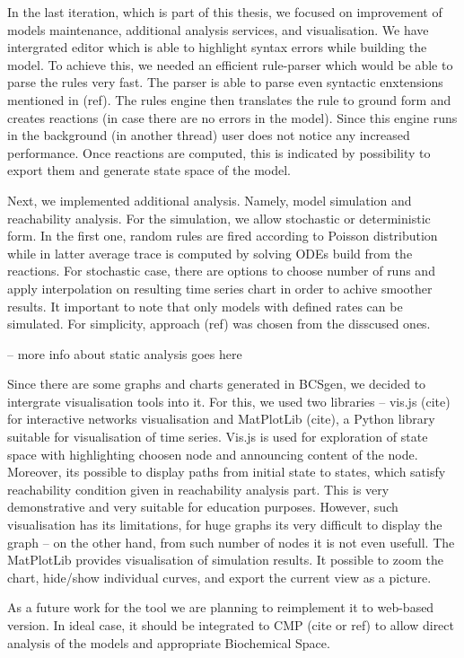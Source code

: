 \documentclass[12pt]{fithesis2}
\begin{document}
In the last iteration, which is part of this thesis, we focused on improvement of models maintenance, additional analysis services, and visualisation. We have intergrated editor which is able to highlight syntax errors while building the model. To achieve this, we needed an efficient rule-parser which would be able to parse the rules very fast. The parser is able to parse even syntactic enxtensions mentioned in (ref). The rules engine then translates the rule to ground form and creates reactions (in case there are no errors in the model). Since this engine runs in the background (in another thread) user does not notice any increased performance. Once reactions are computed, this is indicated by possibility to export them and generate state space of the model.

Next, we implemented additional analysis. Namely, model simulation and reachability analysis. For the simulation, we allow stochastic or deterministic form. In the first one, random rules are fired according to Poisson distribution while in latter average trace is computed by solving ODEs build from the reactions. For stochastic case, there are options to choose number of runs and apply interpolation on resulting time series chart in order to achive smoother results. It important to note that only models with defined rates can be simulated. For simplicity, approach (ref) was chosen from the disscused ones.

 -- more info about static analysis goes here

Since there are some graphs and charts generated in BCSgen, we decided to intergrate visualisation tools into it. For this, we used two libraries -- vis.js (cite) for interactive networks visualisation and MatPlotLib (cite), a Python library suitable for visualisation of time series. Vis.js is used for exploration of state space with highlighting choosen node and announcing content of the node. Moreover, its possible to display paths from initial state to states, which satisfy reachability condition given in reachability analysis part. This is very demonstrative and very suitable for education purposes. However, such visualisation has its limitations, for huge graphs its very difficult to display the graph -- on the other hand, from such number of nodes it is not even usefull. The MatPlotLib provides visualisation of simulation results. It possible to zoom the chart, hide/show individual curves, and export the current view as a picture.

As a future work for the tool we are planning to reimplement it to web-based version. In ideal case, it should be integrated to CMP (cite or ref) to allow direct analysis of the models and appropriate Biochemical Space.  
\end{document}
